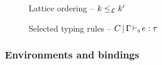 \begin{figure}[tp]
  
  \caption{Lattice ordering -- $k \leq_\mathcal L k'$}
  \label{sdtyp:lattice}
\end{figure}

\begin{figure*}[tp]
  \begin{minipage}{0.28\linewidth}
  \end{minipage}\hfill
  
    \caption{Selected typing rules -- $C \operatorname{|} \Gamma \operatorname{\vdash_s} e : \tau$}
    \label{selectrules:borrow}
    \label{selectrules:binders}
    \label{sdtyp:pair}
    \label{selectrules:region}
    \label{selectrules:matching}
\end{figure*}

\subsubsection{Environments and bindings}
\label{sdtyping:envs}

